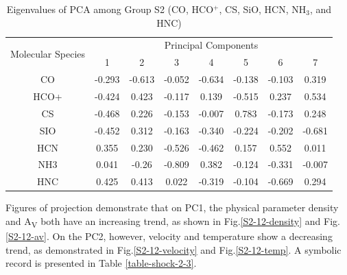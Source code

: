 \documentclass{aa}
\begin{document}
\begin{CJK*}{UTF8}{gbsn}
    \begin{table}[htp]
        \centering
        \begin{tabular}{cccccccc}
        \hline\hline
        \multirow{2}{*}{Molecular Species} & \multicolumn{7}{c}{Principal Components}                 \\ \cline{2-8} 
                                           & 1       & 2       & 3       & 4       & 5      & 6    & 7\\ \hline
        CO   & -0.293  & -0.613 & -0.052 & -0.634 & -0.138 & -0.103 & 0.319 \\ \hline
        HCO+ & -0.424 & 0.423  & -0.117 & 0.139   & -0.515 & 0.237   & 0.534  \\ \hline
        CS   & -0.468 & 0.226  & -0.153 & -0.007 & 0.783  & -0.173 & 0.248  \\ \hline
        SIO  & -0.452  & 0.312   & -0.163 & -0.340 & -0.224 & -0.202 & -0.681 \\ \hline
        HCN  & 0.355  & 0.230  & -0.526  & -0.462 & 0.157  & 0.552   & 0.011  \\ \hline
        NH3  & 0.041  & -0.26 & -0.809 & 0.382  & -0.124 & -0.331 & -0.007  \\ \hline
        HNC  & 0.425  & 0.413  & 0.022  & -0.319 & -0.104 & -0.669 & 0.294  \\ \hline\hline
        \end{tabular}
        \caption{Eigenvalues of PCA among Group S2 (CO, HCO$^+$, CS, SiO, HCN, NH$_3$, and HNC)}
        \label{table-shock-2-eigen}
    \end{table}

    Figures of projection demonstrate that on PC1, the physical parameter density and A\textsubscript{V} both have an increasing trend, as shown in Fig.\ref{S2-12-density} and Fig.\ref{S2-12-av}. 
    On the PC2, however, velocity and temperature show a decreasing trend, as demonstrated in Fig.\ref{S2-12-velocity} and Fig.\ref{S2-12-temp}. 
    A symbolic record is presented in Table \ref{table-shock-2-3}. 


\end{CJK*}
\end{document}
